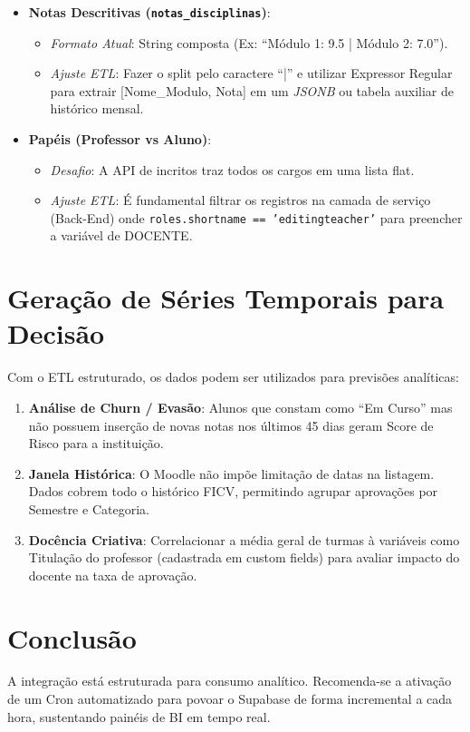 \documentclass{article}
\begin{document}
\begin{itemize}
    \item \textbf{Notas Descritivas (\texttt{notas\_disciplinas})}:
    \begin{itemize}
        \item \textit{Formato Atual}: String composta (Ex: ``Módulo 1: 9.5 | Módulo 2: 7.0'').
        \item \textit{Ajuste ETL}: Fazer o split pelo caractere ``|'' e utilizar Expressor Regular para extrair [Nome\_Modulo, Nota] em um \textit{JSONB} ou tabela auxiliar de histórico mensal.
    \end{itemize}
    \item \textbf{Papéis (Professor vs Aluno)}:
    \begin{itemize}
        \item \textit{Desafio}: A API de incritos traz todos os cargos em uma lista flat.
        \item \textit{Ajuste ETL}: É fundamental filtrar os registros na camada de serviço (Back-End) onde \texttt{roles.shortname == 'editingteacher'} para preencher a variável de DOCENTE.
    \end{itemize}
\end{itemize}

\section{Geração de Séries Temporais para Decisão}
Com o ETL estruturado, os dados podem ser utilizados para previsões analíticas:

\begin{enumerate}
    \item \textbf{Análise de Churn / Evasão}: Alunos que constam como ``Em Curso'' mas não possuem inserção de novas notas nos últimos 45 dias geram Score de Risco para a instituição.
    \item \textbf{Janela Histórica}: O Moodle não impõe limitação de datas na listagem. Dados cobrem todo o histórico FICV, permitindo agrupar aprovações por Semestre e Categoria.
    \item \textbf{Docência Criativa}: Correlacionar a média geral de turmas à variáveis como Titulação do professor (cadastrada em custom fields) para avaliar impacto do docente na taxa de aprovação.
\end{enumerate}

\section{Conclusão}
A integração está estruturada para consumo analítico. Recomenda-se a ativação de um Cron automatizado para povoar o Supabase de forma incremental a cada hora, sustentando painéis de BI em tempo real.
\end{document}
